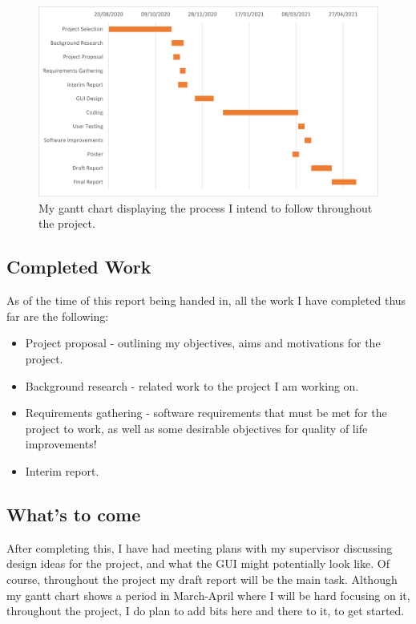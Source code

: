 \documentclass[a4paper, 12pt]{article}
\begin{document}
        \begin{figure}[h]
            \centering
            \includegraphics[width=150mm]{gantt_chart.png}
            \caption{My gantt chart displaying the process I intend to follow throughout
            the project.}
        \end{figure}

        \subsection{Completed Work}
            As of the time of this report being handed in, all the work I have completed thus
            far are the following:

            \begin{itemize}
                \item Project proposal - outlining my objectives, aims and motivations for the
                project.
                \item Background research - related work to the project I am working on.
                \item Requirements gathering - software requirements that must be met for
                the project to work, as well as some desirable objectives for quality of
                life improvements!
                \item Interim report.
            \end{itemize}

        \subsection{What's to come}
            After completing this, I have had meeting plans with my supervisor discussing
            design ideas for the project, and what the GUI might potentially look like.
            Of course, throughout the project my draft report will be the main task. Although
            my gantt chart shows a period in March-April where I will be hard focusing on it,
            throughout the project, I do plan to add bits here and there to it, to get started.
\end{document}
